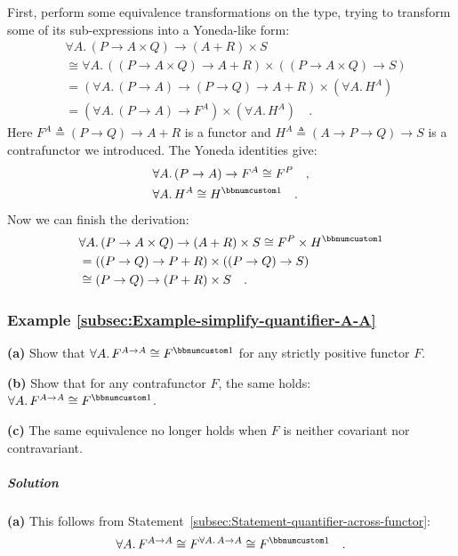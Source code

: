 First, perform some equivalence transformations on the type, trying
to transform some of its sub-expressions into a Yoneda-like form:
\begin{align*}
 & \forall A.\,(P\rightarrow A\times Q)\rightarrow(A+R)\times S\\
 & \cong\forall A.\,((P\rightarrow A\times Q)\rightarrow A+R)\times((P\rightarrow A\times Q)\rightarrow S)\\
 & =(\forall A.\,(P\rightarrow A)\rightarrow(P\rightarrow Q)\rightarrow A+R)\times(\forall A.\,H^{A})\\
 & =(\forall A.\,(P\rightarrow A)\rightarrow F^{A})\times(\forall A.\,H^{A})\quad.
\end{align*}
Here $F^{A}\triangleq(P\rightarrow Q)\rightarrow A+R$ is a functor
and $H^{A}\triangleq(A\rightarrow P\rightarrow Q)\rightarrow S$ is
a contrafunctor we introduced. The Yoneda identities give:
\begin{align*}
 & \forall A.\,(P\rightarrow A)\rightarrow F^{A}\cong F^{P}\quad,\\
 & \forall A.\,H^{A}\cong H^{\bbnum 1}\quad.
\end{align*}
Now we can finish the derivation:
\begin{align*}
 & \forall A.\,(P\rightarrow A\times Q)\rightarrow(A+R)\times S\cong F^{P}\times H^{\bbnum 1}\\
 & =((P\rightarrow Q)\rightarrow P+R)\times((P\rightarrow Q)\rightarrow S)\\
 & \cong(P\rightarrow Q)\rightarrow(P+R)\times S\quad.
\end{align*}


\subsubsection{Example \label{subsec:Example-simplify-quantifier-A-A}\ref{subsec:Example-simplify-quantifier-A-A}}

\textbf{(a)} Show that $\forall A.\,F^{A\rightarrow A}\cong F^{\bbnum 1}$
for any strictly positive functor $F$.

\textbf{(b)} Show that for any contrafunctor $F$, the same holds:
$\forall A.\,F^{A\rightarrow A}\cong F^{\bbnum 1}$.

\textbf{(c)} The same equivalence no longer holds when $F$ is neither
covariant nor contravariant.

\subparagraph{Solution}

\textbf{(a)} This follows from Statement~\ref{subsec:Statement-quantifier-across-functor}:
\[
\forall A.\,F^{A\rightarrow A}\cong F^{\forall A.\,A\rightarrow A}\cong F^{\bbnum 1}\quad.
\]

